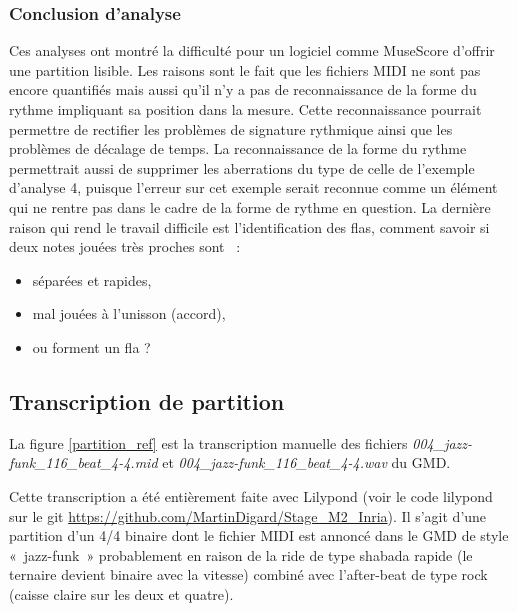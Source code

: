 \subsubsection{Conclusion d’analyse}
Ces analyses ont montré la difficulté pour un logiciel comme MuseScore d’offrir
une partition lisible. Les raisons sont le fait que les fichiers MIDI ne sont
pas encore quantifiés mais aussi qu’il n’y a pas de reconnaissance de la forme 
du rythme impliquant sa position dans la mesure. Cette reconnaissance pourrait
permettre de rectifier les problèmes de signature rythmique ainsi que les
problèmes de décalage de temps. La reconnaissance de la forme du rythme
permettrait aussi de supprimer les aberrations du type de celle de l’exemple
d’analyse 4, puisque l’erreur sur cet exemple serait reconnue comme un élément
qui ne rentre pas dans le cadre de la forme de rythme en question. La dernière
raison qui rend le travail difficile est l’identification des flas, comment
savoir si deux notes jouées très proches sont~ :
\begin{itemize}
    \item séparées et rapides,
    \item mal jouées à l’unisson (accord),
    \item ou forment un fla ?
\end{itemize}


\subsection*{Transcription de partition}
\label{partition_entiere}
La figure \ref{partition_ref} est la transcription manuelle des fichiers
\textit{004\_jazz-funk\_116\_beat\_4-4.mid} et
\textit{004\_jazz-funk\_116\_beat\_4-4.wav} du GMD.

Cette transcription a été entièrement faite avec Lilypond (voir le code
lilypond sur le git \url{https://github.com/MartinDigard/Stage_M2_Inria}). Il
s’agit d’une partition d’un 4/4 binaire dont le fichier MIDI est annoncé dans
le GMD de style «~jazz-funk~» probablement en raison de la ride de type shabada
rapide (le ternaire devient binaire avec la vitesse) combiné avec l’after-beat
de type rock (caisse claire sur les deux et quatre).

